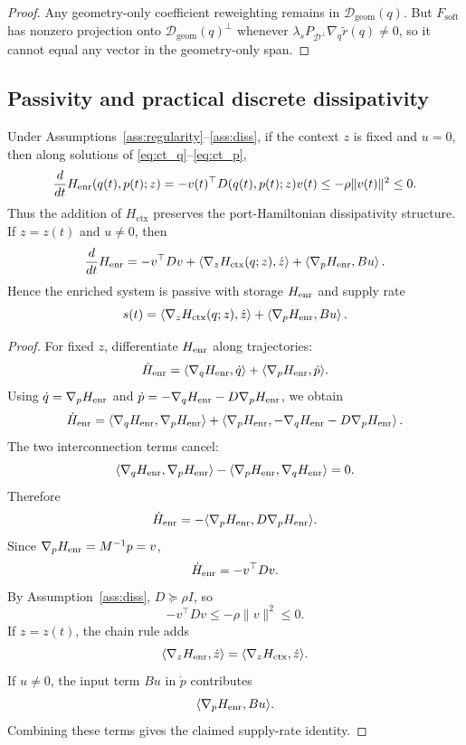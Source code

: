 \begin{proof}
Any geometry-only coefficient reweighting remains in
\(\mathcal D_{\mathrm{geom}}(q)\). But
\(F_{\mathrm{soft}}\) has nonzero projection onto
\(\mathcal D_{\mathrm{geom}}(q)^\perp\) whenever
\(\lambda_sP_{\mathcal D^\perp}\nabla_q\widetilde r(q)\neq0\), so it cannot equal
any vector in the geometry-only span.
\end{proof}

\subsection{Passivity and practical discrete dissipativity}

\begin{theorem}
\label{thm:continuous_passivity}
Under Assumptions~\ref{ass:regularity}--\ref{ass:diss}, if the context \(z\) is
fixed and \(u=0\), then along solutions of \eqref{eq:ct_q}--\eqref{eq:ct_p},
\[
    \frac{d}{dt}H_{\rm enr}(q(t),p(t);z)
    =
    -v(t)^\top D(q(t),p(t);z)v(t)
    \le
    -\rho\|v(t)\|^2
    \le 0 .
\]
Thus the addition of \(H_{\mathrm{ctx}}\) preserves the port-Hamiltonian dissipativity
structure. If \(z=z(t)\) and \(u\neq0\), then
\[
    \frac{d}{dt}H_{\rm enr}
    =
    -v^\top Dv
    +
    \left\langle \nabla_zH_{\mathrm{ctx}}(q;z),\dot z \right\rangle
    +
    \left\langle \nabla_pH_{\rm enr},Bu \right\rangle .
\]
Hence the enriched system is passive with storage \(H_{\rm enr}\) and supply rate
\[
    s(t)
    =
    \left\langle \nabla_zH_{\mathrm{ctx}}(q;z),\dot z \right\rangle
    +
    \left\langle \nabla_pH_{\rm enr},Bu \right\rangle .
\]
\end{theorem}

\begin{proof}
For fixed \(z\), differentiate \(H_{\rm enr}\) along trajectories:
\[
    \dot H_{\rm enr}
    =
    \langle\nabla_qH_{\rm enr},\dot q\rangle
    +
    \langle\nabla_pH_{\rm enr},\dot p\rangle .
\]
Using \(\dot q=\nabla_pH_{\rm enr}\) and
\(\dot p=-\nabla_qH_{\rm enr}-D\nabla_pH_{\rm enr}\), we obtain
\[
    \dot H_{\rm enr}
    =
    \langle\nabla_qH_{\rm enr},\nabla_pH_{\rm enr}\rangle
    +
    \left\langle
    \nabla_pH_{\rm enr},
    -\nabla_qH_{\rm enr}-D\nabla_pH_{\rm enr}
    \right\rangle .
\]
The two interconnection terms cancel:
\[
    \langle\nabla_qH_{\rm enr},\nabla_pH_{\rm enr}\rangle
    -
    \langle\nabla_pH_{\rm enr},\nabla_qH_{\rm enr}\rangle=0.
\]
Therefore
\[
    \dot H_{\rm enr}
    =
    -\langle\nabla_pH_{\rm enr},D\nabla_pH_{\rm enr}\rangle.
\]
Since \(\nabla_pH_{\rm enr}=M^{-1}p=v\),
\[
    \dot H_{\rm enr}=-v^\top Dv.
\]
By Assumption~\ref{ass:diss}, \(D\succeq \rho I\), so
\[
    -v^\top Dv\le -\rho\|v\|^2\le 0.
\]
If \(z=z(t)\), the chain rule adds
\[
    \langle\nabla_zH_{\rm enr},\dot z\rangle
    =
    \langle\nabla_zH_{\mathrm{ctx}},\dot z\rangle .
\]
If \(u\neq 0\), the input term \(Bu\) in \(\dot p\) contributes
\[
    \langle\nabla_pH_{\rm enr},Bu\rangle .
\]
Combining these terms gives the claimed supply-rate identity.
\end{proof}

